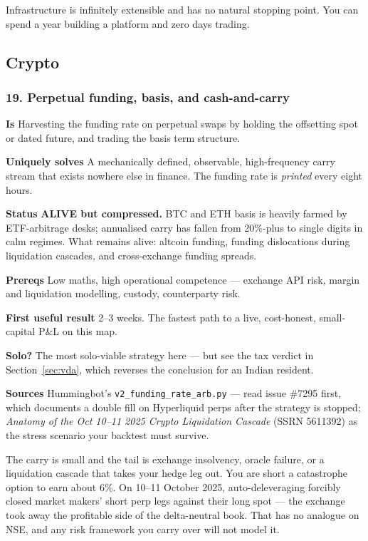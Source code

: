\documentclass[11pt,a4paper]{article}
\newcommand{\alv}[1]{\textcolor{alive}{\textbf{#1}}}
\newcommand{\fitem}[1]{\par\smallskip\noindent\textbf{#1} }
\begin{document}
\begin{waste}
Infrastructure is infinitely extensible and has no natural stopping point. You
can spend a year building a platform and zero days trading.
\end{waste}

\subsection{Crypto}

\subsubsection{19. Perpetual funding, basis, and cash-and-carry}
\fitem{Is}Harvesting the funding rate on perpetual swaps by holding the
offsetting spot or dated future, and trading the basis term structure.
\fitem{Uniquely solves}A mechanically defined, observable, high-frequency carry
stream that exists nowhere else in finance. The funding rate is \emph{printed}
every eight hours.
\fitem{Status}\alv{ALIVE but compressed.} BTC and ETH basis is heavily farmed by
ETF-arbitrage desks; annualised carry has fallen from 20\%-plus to single digits
in calm regimes. What remains alive: altcoin funding, funding dislocations during
liquidation cascades, and cross-exchange funding spreads.
\fitem{Prereqs}Low maths, high operational competence --- exchange API risk,
margin and liquidation modelling, custody, counterparty risk.
\fitem{First useful result}2--3 weeks. The fastest path to a live, cost-honest,
small-capital P\&L on this map.
\fitem{Solo?}The most solo-viable strategy here --- but see the tax verdict in
Section~\ref{sec:vda}, which reverses the conclusion for an Indian resident.
\fitem{Sources}Hummingbot's \texttt{v2\_funding\_rate\_arb.py} --- read issue
\#7295 first, which documents a double fill on Hyperliquid perps after the
strategy is stopped; \emph{Anatomy of the Oct 10--11 2025 Crypto Liquidation
Cascade} (SSRN 5611392) as the stress scenario your backtest must survive.

\begin{waste}
The carry is small and the tail is exchange insolvency, oracle failure, or a
liquidation cascade that takes your hedge leg out. You are short a catastrophe
option to earn about 6\%. On 10--11 October 2025, auto-deleveraging forcibly
closed market makers' short perp legs against their long spot --- the exchange
took away the profitable side of the delta-neutral book. That has no analogue on
NSE, and any risk framework you carry over will not model it.
\end{waste}
\end{document}

